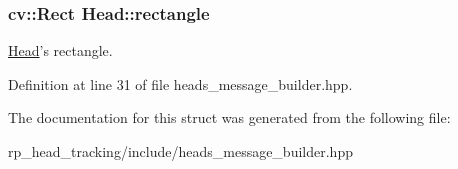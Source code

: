 \hypertarget{struct_head_abab8dfa974c091d1af36c7182e8d1ae2}{
\subsubsection[{rectangle}]{\setlength{\rightskip}{0pt plus 5cm}cv\-::\-Rect {\bf \-Head\-::rectangle}}}\label{struct_head_abab8dfa974c091d1af36c7182e8d1ae2}
\hyperlink{struct_head}{\-Head}'s rectangle. 

\-Definition at line 31 of file heads\-\_\-message\-\_\-builder.\-hpp.



\-The documentation for this struct was generated from the following file\-:\begin{DoxyCompactItemize}
\item 
rp\-\_\-head\-\_\-tracking/include/heads\-\_\-message\-\_\-builder.\-hpp\end{DoxyCompactItemize}
